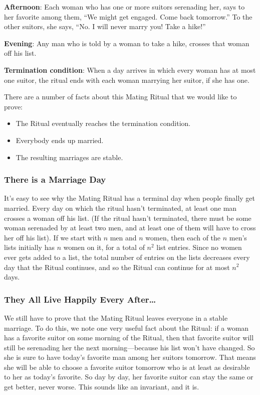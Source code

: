 \textbf{Afternoon}: Each woman who has one or more suitors serenading
her, says to her favorite among them, ``We might get engaged.  Come
back tomorrow.''  To the other suitors, she says, ``No.  I will never
marry you!  Take a hike!''

\textbf{Evening}: Any man who is told by a woman to take a hike,
crosses that woman off his list.

\textbf{Termination condition}: When a day arrives in which every
woman has at most one suitor, the ritual ends with each woman marrying
her suitor, if she has one.


There are a number of facts about this Mating Ritual that we would like to
prove:

\begin{itemize}
\item The Ritual eventually reaches the termination condition.
\item Everybody ends up married.
\item The resulting marriages are stable.
\end{itemize}


\subsubsection{There is a Marriage Day}

It's easy to see why the Mating Ritual has a terminal day when people
finally get married.  Every day on which the ritual hasn't terminated, at
least one man crosses a woman off his list.  (If the ritual hasn't
terminated, there must be some woman serenaded by at least two men, and at
least one of them will have to cross her off his list).  If we start with
$n$ men and $n$ women, then each of the $n$ men's lists initially has $n$
women on it, for a total of $n^2$ list entries.  Since no women ever gets
added to a list, the total number of entries on the lists decreases every
day that the Ritual continues, and so the Ritual can continue for at most
$n^2$ days.

\subsubsection{They All Live Happily Every After\dots}

We still have to prove that the Mating Ritual leaves everyone in a
stable marriage.  To do this, we note one very useful fact about the
Ritual: if a woman has a favorite suitor on some morning of the
Ritual, then that favorite suitor will still be serenading her the
next morning---because his list won't have changed.  So she is sure to
have today's favorite man among her suitors tomorrow.  That means she
will be able to choose a favorite suitor tomorrow who is at least as
desirable to her as today's favorite.  So day by day, her favorite
suitor can stay the same or get better, never worse.  This sounds like
an invariant, and it is.

